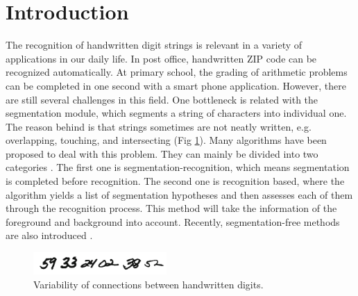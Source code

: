 


% 


\section{Introduction}


The recognition of handwritten digit strings is relevant in a variety of applications in our daily life. In post office, handwritten ZIP code can be recognized automatically. At primary school, the grading of arithmetic problems can be completed in one second with a smart phone application. However, there are still several challenges in this field. One bottleneck is related with the segmentation module, which segments a string of characters into individual one. The reason behind is that strings sometimes are not neatly written, e.g. overlapping, touching, and intersecting (Fig \ref{example}). Many algorithms have been proposed to deal with this problem. They can mainly be divided into two categories \citep{casey1996}. The first one is segmentation-recognition, which means segmentation is completed before recognition. The second one is recognition based, where the algorithm yields a list of segmentation hypotheses and then assesses each of them through the recognition process. This method will take the information of the foreground and background into account. Recently, segmentation-free methods are also introduced \citep{hochuli2018}.

\begin{figure}[ht] %
   \centering
   \includegraphics[width=2in]{example.png} 
   \caption{Variability of connections between handwritten digits.}
   \label{example}
\end{figure}

